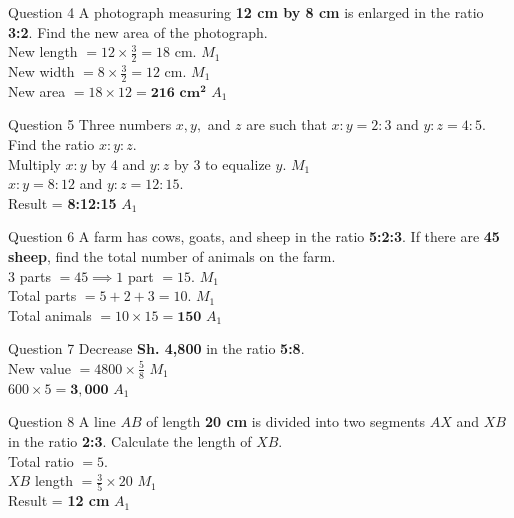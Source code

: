 \documentclass[12pt, a4paper, oneside]{article}
\begin{document}
\begin{solvingbox}{Question 4}
A photograph measuring \textbf{12 cm by 8 cm} is enlarged in the ratio \textbf{3:2}. Find the new area of the photograph. \\
New length $= 12 \times \frac{3}{2} = 18$ cm. \hfill $M_1$ \\
New width $= 8 \times \frac{3}{2} = 12$ cm. \hfill $M_1$ \\
New area $= 18 \times 12 = \mathbf{216\text{ cm}^2}$ \hfill $A_1$
\end{solvingbox}

\begin{solvingbox}{Question 5}
Three numbers $x, y,$ and $z$ are such that $x:y = 2:3$ and $y:z = 4:5$. Find the ratio \textbf{$x:y:z$}. \\
Multiply $x:y$ by 4 and $y:z$ by 3 to equalize $y$. \hfill $M_1$ \\
$x:y = 8:12$ and $y:z = 12:15$. \\
Result = \textbf{8:12:15} \hfill $A_1$
\end{solvingbox}

\begin{solvingbox}{Question 6}
A farm has cows, goats, and sheep in the ratio \textbf{5:2:3}. If there are \textbf{45 sheep}, find the total number of animals on the farm. \\
3 parts $= 45 \implies 1$ part $= 15$. \hfill $M_1$ \\
Total parts $= 5+2+3 = 10$. \hfill $M_1$ \\
Total animals $= 10 \times 15 = \mathbf{150}$ \hfill $A_1$
\end{solvingbox}

\begin{solvingbox}{Question 7}
Decrease \textbf{Sh. 4,800} in the ratio \textbf{5:8}. \\
New value $= 4800 \times \frac{5}{8}$ \hfill $M_1$ \\
$600 \times 5 = \mathbf{3,000}$ \hfill $A_1$
\end{solvingbox}

\begin{solvingbox}{Question 8}
A line $AB$ of length \textbf{20 cm} is divided into two segments $AX$ and $XB$ in the ratio \textbf{2:3}. Calculate the length of $XB$. \\
Total ratio $= 5$. \\
$XB$ length $= \frac{3}{5} \times 20$ \hfill $M_1$ \\
Result = \textbf{12 cm} \hfill $A_1$
\end{solvingbox}
\end{document}
